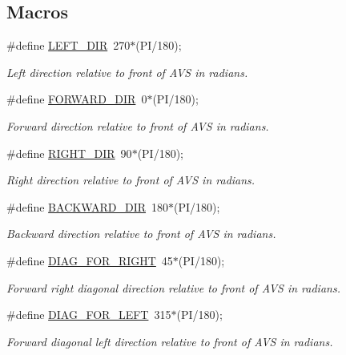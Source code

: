 \subsection*{Macros}
\begin{DoxyCompactItemize}
\item 
\#define \mbox{\hyperlink{bot_main_8ino_a748e2ff253570331d3cd8f51ccc17f03}{L\+E\+F\+T\+\_\+\+D\+IR}}~270$\ast$(PI/180);
\begin{DoxyCompactList}\small\item\em Left direction relative to front of A\+VS in radians. \end{DoxyCompactList}\item 
\#define \mbox{\hyperlink{bot_main_8ino_afb3e7729ac5d0aab2fec8a9cc664e576}{F\+O\+R\+W\+A\+R\+D\+\_\+\+D\+IR}}~0$\ast$(PI/180);
\begin{DoxyCompactList}\small\item\em Forward direction relative to front of A\+VS in radians. \end{DoxyCompactList}\item 
\#define \mbox{\hyperlink{bot_main_8ino_a280580881770229c533faab28f235a05}{R\+I\+G\+H\+T\+\_\+\+D\+IR}}~90$\ast$(PI/180);
\begin{DoxyCompactList}\small\item\em Right direction relative to front of A\+VS in radians. \end{DoxyCompactList}\item 
\#define \mbox{\hyperlink{bot_main_8ino_af55f8c08a83dc71a5c0c9dbb75fe099f}{B\+A\+C\+K\+W\+A\+R\+D\+\_\+\+D\+IR}}~180$\ast$(PI/180);
\begin{DoxyCompactList}\small\item\em Backward direction relative to front of A\+VS in radians. \end{DoxyCompactList}\item 
\#define \mbox{\hyperlink{bot_main_8ino_af0d4dc28dbd73c9eaadb8316bd959191}{D\+I\+A\+G\+\_\+\+F\+O\+R\+\_\+\+R\+I\+G\+HT}}~45$\ast$(PI/180);
\begin{DoxyCompactList}\small\item\em Forward right diagonal direction relative to front of A\+VS in radians. \end{DoxyCompactList}\item 
\#define \mbox{\hyperlink{bot_main_8ino_a7cfa9cd93a3a325dcce552ff4372733a}{D\+I\+A\+G\+\_\+\+F\+O\+R\+\_\+\+L\+E\+FT}}~315$\ast$(PI/180);
\begin{DoxyCompactList}\small\item\em Forward diagonal left direction relative to front of A\+VS in radians. \end{DoxyCompactList}\item 

\end{DoxyCompactItemize}
